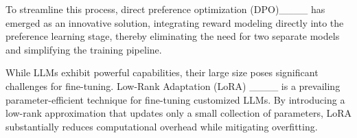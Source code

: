 To streamline this process, direct preference optimization (DPO)____ has emerged as an innovative solution, integrating reward modeling directly into the preference learning stage, thereby eliminating the need for two separate models and simplifying the training pipeline.   
\comment{%


}


While LLMs exhibit powerful capabilities, their large size poses significant challenges for fine-tuning. 
Low-Rank Adaptation (LoRA) ____ is a prevailing parameter-efficient technique for fine-tuning customized LLMs. By introducing a low-rank approximation that updates only a small collection of parameters, LoRA substantially reduces computational overhead while mitigating overfitting. 

